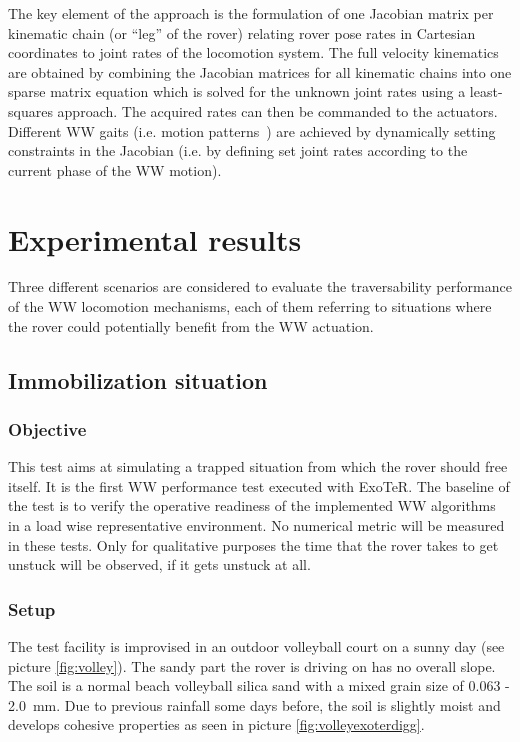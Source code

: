 \documentclass[a4paper,twocolumn]{esapub2005} %
\begin{document}
The key element of the approach is the formulation of one Jacobian matrix per 
kinematic chain (or ``leg'' of the rover) relating rover pose rates in 
Cartesian coordinates to joint rates of the locomotion system. The full 
velocity kinematics are obtained by combining the Jacobian 
matrices for all kinematic chains into one sparse matrix equation which is 
solved for the unknown joint rates using a least-squares approach. The 
acquired rates can then be commanded to the actuators. Different WW gaits (i.e. 
motion patterns~\cite{LucWalkingGaits}) are achieved by dynamically setting 
constraints in the Jacobian (i.e. by defining set joint rates according to the 
current phase of the WW motion).


\section{Experimental results}

Three different scenarios are considered to evaluate the traversability
performance of the WW locomotion mechanisms, each of them referring
to situations where the rover could potentially benefit from the WW
actuation.

\subsection{Immobilization situation} 

\subsubsection{Objective} This test aims at simulating a trapped situation from
which the rover should free itself. It is the first WW performance test
executed with ExoTeR. The baseline of the test is to verify the operative
readiness of the implemented WW algorithms in a load wise representative
environment.  No numerical metric will be measured in these tests. Only for
qualitative purposes the time that the rover takes to get unstuck will be
observed, if it gets unstuck at all.

\subsubsection{Setup} The test facility is improvised in an outdoor volleyball
court on a sunny day (see picture \ref{fig:volley}). The sandy part the rover
is driving on has no overall slope. The soil is a normal beach volleyball
silica sand with a mixed grain size of 0.063 - 2.0~\unit{mm}. Due to previous rainfall
some days before, the soil is slightly moist and develops cohesive properties
as seen in picture \ref{fig:volleyexoterdigg}. 
\end{document}
